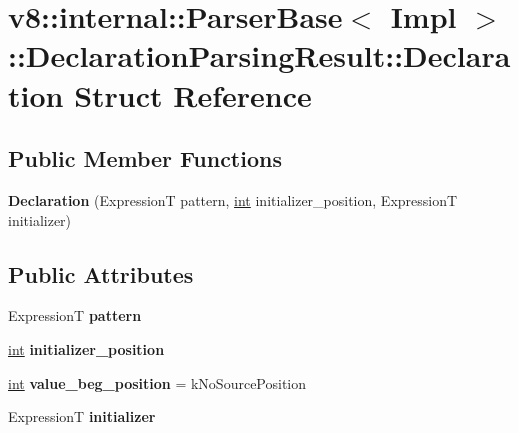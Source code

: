 \hypertarget{structv8_1_1internal_1_1ParserBase_1_1DeclarationParsingResult_1_1Declaration}{}\section{v8\+:\+:internal\+:\+:Parser\+Base$<$ Impl $>$\+:\+:Declaration\+Parsing\+Result\+:\+:Declaration Struct Reference}
\label{structv8_1_1internal_1_1ParserBase_1_1DeclarationParsingResult_1_1Declaration}
\subsection*{Public Member Functions}
\begin{DoxyCompactItemize}
\item 
\mbox{\label{structv8_1_1internal_1_1ParserBase_1_1DeclarationParsingResult_1_1Declaration_ae8d9bb6346ef782fc67933fe79aa577c}} 
{\bfseries Declaration} (ExpressionT pattern, \mbox{\hyperlink{classint}{int}} initializer\+\_\+position, ExpressionT initializer)
\end{DoxyCompactItemize}
\subsection*{Public Attributes}
\begin{DoxyCompactItemize}
\item 
\mbox{\label{structv8_1_1internal_1_1ParserBase_1_1DeclarationParsingResult_1_1Declaration_aa630c9baa31c817b8b1e11bea01f201a}} 
ExpressionT {\bfseries pattern}
\item 
\mbox{\label{structv8_1_1internal_1_1ParserBase_1_1DeclarationParsingResult_1_1Declaration_adf155a2b5a93a8998184cafeda4ef781}} 
\mbox{\hyperlink{classint}{int}} {\bfseries initializer\+\_\+position}
\item 
\mbox{\label{structv8_1_1internal_1_1ParserBase_1_1DeclarationParsingResult_1_1Declaration_a037ec18f01b72c05106973cc050ed5fa}} 
\mbox{\hyperlink{classint}{int}} {\bfseries value\+\_\+beg\+\_\+position} = k\+No\+Source\+Position
\item 
\mbox{\label{structv8_1_1internal_1_1ParserBase_1_1DeclarationParsingResult_1_1Declaration_a9cba3edc15749dcc2cf63d5540c2adc4}} 
ExpressionT {\bfseries initializer}
\end{DoxyCompactItemize}


